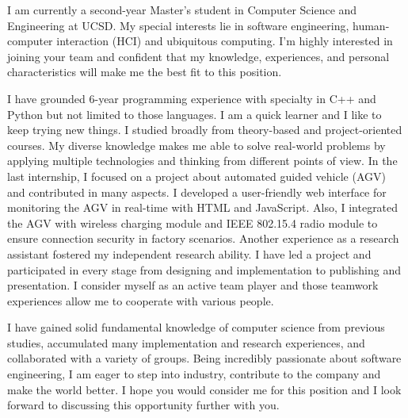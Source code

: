 \documentclass[13pt, a4paper]{awesome-cv}
\begin{document}
\makecvheader

\makelettertitle

\begin{cvletter}

\cvparagraph{}

I am currently a second-year Master's student in Computer Science and Engineering at UCSD. My special interests lie in software engineering, human-computer interaction (HCI) and ubiquitous computing. I'm highly interested in joining your team and confident that my knowledge, experiences, and personal characteristics will make me the best fit to this position.

I have grounded 6-year programming experience with specialty in C++ and Python but not limited to those languages. I am a quick learner and I like to keep trying new things. I studied broadly from theory-based and project-oriented courses. My diverse knowledge makes me able to solve real-world problems by applying multiple technologies and thinking from different points of view. In the last internship, I focused on a project about automated guided vehicle (AGV) and contributed in many aspects. I developed a user-friendly web interface for monitoring the AGV in real-time with HTML and JavaScript. Also, I integrated the AGV with wireless charging module and IEEE 802.15.4 radio module to ensure connection security in factory scenarios. Another experience as a research assistant fostered my independent research ability. I have led a project and participated in every stage from designing and implementation to publishing and presentation. I consider myself as an active team player and those teamwork experiences allow me to cooperate with various people.

I have gained solid fundamental knowledge of computer science from previous studies, accumulated many implementation and research experiences, and collaborated with a variety of groups. Being incredibly passionate about software engineering, I am eager to step into industry, contribute to the company and make the world better. I hope you would consider me for this position and I look forward to discussing this opportunity further with you.

\end{cvletter}

\makeletterclosing
\end{document}
